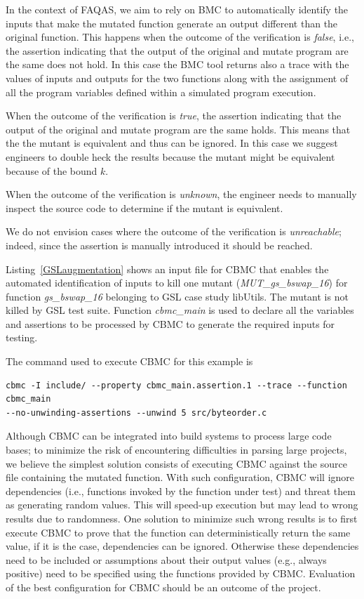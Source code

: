 In the context of FAQAS, we aim to rely on BMC to automatically identify the inputs that make the mutated function generate an output different than the original function. This happens when the outcome of the verification is \emph{false}, i.e., the assertion indicating that the output of the original and mutate program are the same does not hold. In this case the BMC tool returns also a trace with the values of inputs and outputs for the two functions along with the assignment of all the program variables defined within a simulated program execution.

When the outcome of the verification is \emph{true}, the assertion indicating that the output of the original and mutate program are the same holds. This means that the the mutant is equivalent and thus can be ignored. In this case we suggest engineers to double heck the results because the mutant might be equivalent because of  the bound $k$.

When the outcome of the verification is \emph{unknown}, the engineer needs to manually inspect the source code to determine if the mutant is equivalent.

We do not envision cases where the outcome of the verification is \emph{unreachable}; indeed, since the assertion is manually introduced it should be reached.





Listing~\ref{GSLaugmentation} shows an input file for CBMC that enables the automated identification of inputs to kill one mutant (\emph{MUT\_gs\_bswap\_16}) for function \emph{gs\_bswap\_16} belonging to GSL case study libUtils. The mutant 
is not killed by GSL test suite. Function \emph{cbmc\_main} is used to declare all the variables and assertions to be processed by CBMC to generate the required inputs for testing.

The command used to execute CBMC for this example is
\begin{verbatim}
cbmc -I include/ --property cbmc_main.assertion.1 --trace --function cbmc_main 
--no-unwinding-assertions --unwind 5 src/byteorder.c\end{verbatim}

Although CBMC can be integrated into build systems to process large code bases; to minimize the risk of encountering difficulties in parsing large projects, we believe the simplest solution consists of executing CBMC against the source file containing the mutated function. With such configuration, CBMC will ignore dependencies (i.e., functions invoked by the function under test) and threat them as generating random values. This will speed-up execution but may lead to wrong results due to randomness. One solution to minimize such wrong results is to first execute CBMC to prove that the function can deterministically return the same value, if it is the case, dependencies can be ignored. Otherwise these dependencies need to be included or assumptions about their output values (e.g., always positive) need to be specified using the functions provided by CBMC. Evaluation of the best configuration for CBMC should be an outcome of the project.


